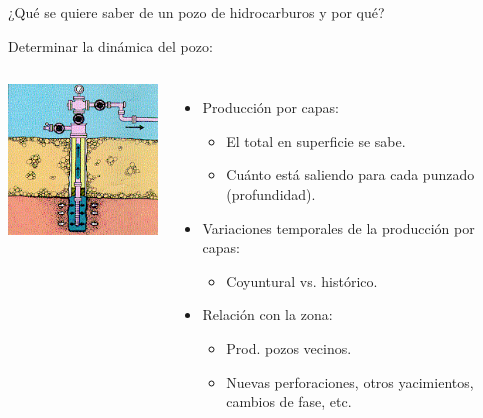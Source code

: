 \documentclass[presentation]{beamer}
\begin{document}
\begin{frame}{¿Qué se quiere saber de un pozo de hidrocarburos y por qué?}
	\begin{block}{Determinar la dinámica del pozo:}
	\end{block}
	\begin{columns}
	\includegraphics[width=\textwidth]{./pozo.png}
		
	\begin{itemize}
	\item Producción por capas:
	\begin{itemize}
		\item El total en superficie se sabe.
		\item Cuánto está saliendo para cada punzado (profundidad).
	\end{itemize}
	\item Variaciones temporales de la producción por capas:
		\begin{itemize}
		\item Coyuntural vs. histórico.
	\end{itemize}
	
	\item Relación con la zona: %
		\begin{itemize}
			\item Prod. pozos vecinos.
			\item Nuevas perforaciones, otros yacimientos, cambios de fase, etc.
		\end{itemize}

	\end{itemize}
\end{columns}
\end{frame}
\end{document}
